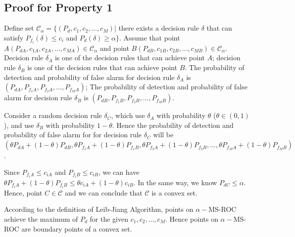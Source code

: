 \documentclass[12pt,journal,a4paper,twoside,onecolumn]{IEEEtran}
\begin{document}
\begin{spacing}{2.5}
\subsection{Proof for Property 1}
Define set $\mathcal{C}_\alpha = \{
(P_d, c_1, c_2, ..., c_M)|$ there exists a decision rule $\delta$ that can satisfy $P_{f_i}(\delta) \leq c_i$  and $P_d(\delta) \geq \alpha
\}$.
Assume that point $A(P_{dA}, c_{1A}, c_{2A}, ..., c_{MA}) \in \mathcal{C}_\alpha$ and point $B(P_{dB}, c_{1B}, c_{2B}, ..., c_{MB}) \in \mathcal{C}_\alpha$. Decision rule $\delta_A$ is one of the decision rules that can achieve point $A$; decision rule $\delta_B$ is one of the decision rules that can achieve point $B$. The probability of detection and probability of false alarm for decision rule $\delta_A$ is $(P_{dA}, P_{f_1A}, P_{f_2A}, ..., P_{f_MA})$; The probability of detection and probability of false alarm for decision rule $\delta_B$ is $(P_{dB}, P_{f_1B}, P_{f_2B}, ..., P_{f_MB})$.

Consider a random decision rule $\delta_C$, which use $\delta_A$ with probability $\theta$ ($\theta \in (0, 1)$), and use $\delta_B$ with probability $1 - \theta$. Hence the probability of detection and probability of false alarm for for decision rule $\delta_C$ will be $(\theta P_{dA} + (1 - \theta)P_{dB}, \theta P_{f_1A} + (1 - \theta)P_{f_1B}, \theta P_{f_2A} + (1 - \theta)P_{f_2B}, ..., \theta P_{f_MA} + (1 - \theta)P_{f_MB})$.

Since $P_{f_iA} \leq c_{iA}$ and $P_{f_iB} \leq c_{iB}$, we can have $\theta P_{f_iA} + (1 - \theta)P_{f_iB} \leq \theta c_{iA} + (1 - \theta)c_{iB}$. In the same way, we know $P_{dC} \leq \alpha$. Hence, point $C \in \mathcal{C}$ and  we can conclude that $\mathcal{C}$ is a convex set.

According to the definition of Leib-Jiang Algorithm, points on $\alpha-$MS-ROC achieve the maximum of $P_d$ for the given $c_1, c_2, ..., c_M$. Hence points on  $\alpha-$MS-ROC are boundary points of  a convex set.


\end{spacing}
\end{document}
